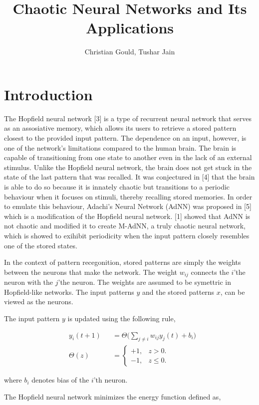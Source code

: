 \documentclass[12pt, letterpaper]{article}
\title{Chaotic Neural Networks and Its Applications}
\author{Christian Gould, Tushar Jain}
\date{}
\begin{document}
\maketitle

\section*{Introduction}

The Hopfield neural network [3] is a type of recurrent neural network that serves as an assosiative memory, which allows its users to retrieve a stored pattern closest to the provided input pattern. The dependence on an input, however, is one of the network's limitations compared to the human brain. The brain is capable of transitioning from one state to another even in the lack of an external stimulus. Unlike the Hopfield neural network, the brain does not get stuck in the state of the last pattern that was recalled. It was conjectured in [4] that the brain is able to do so because it is innately chaotic but transitions to a periodic behaviour when it focuses on stimuli, thereby recalling stored memories. In order to emulate this behaviour, Adachi’s Neural Network (AdNN) was proposed in [5] which is a modification of the Hopfield neural network. [1] showed that AdNN is not chaotic and modified it to create M-AdNN, a truly chaotic neural network, which is showed to exihibit periodicity when the input pattern closely resembles one of the stored states.

In the context of pattern recegonition, stored patterns are simply the weights between the neurons that make the network. The weight $w_{ij}$ connects the $i$'the neuron with the $j$'the neuron. The weights are assumed to be symettric in Hopfield-like networks. The input patterns $y$ and the stored patterns $x$, can be viewed as the neurons.

The input pattern $y$ is updated using the following rule,

$$
\begin{aligned}
& y_i(t+1) &&= \Theta\big(\sum_{j \neq i} w_{ij}y_j(t) + b_i \big)\\
& \Theta(z) &&= \begin{cases}
  +1, & z > 0.\\
  -1, & z \le 0.
  \end{cases}
\end{aligned}
$$

where $b_i$ denotes bias of the $i$'th neuron.

The Hopfield neural network minimizes the energy function defined as,
\end{document}
